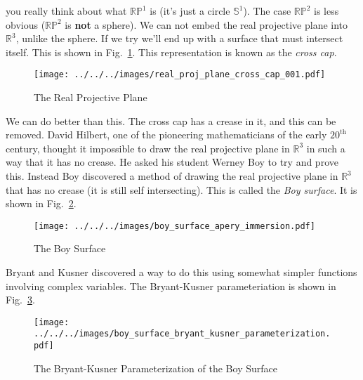 \documentclass{article}
\theoremstyle{plain}
\theoremstyle{normal}
\begin{document}
        you really think about what $\mathbb{RP}^{1}$ is
        (it's just a circle $\mathbb{S}^{1}$). The case $\mathbb{RP}^{2}$ is
        less obvious ($\mathbb{RP}^{2}$ is \textbf{not} a sphere). We can not
        embed the real projective plane into $\mathbb{R}^{3}$, unlike the
        sphere. If we try we'll end up with a surface that must intersect
        itself. This is shown in
        Fig.~\ref{fig:real_proj_plane_cross_cap_001}. This representation is
        known as the \textit{cross cap}.
        \begin{figure}
            \centering
            \texttt{[image: ../../../images/real\_proj\_plane\_cross\_cap\_001.pdf]}
            \caption{The Real Projective Plane}
            \label{fig:real_proj_plane_cross_cap_001}
        \end{figure}
        We can do better than this. The cross cap has a crease in it, and this
        can be removed. David Hilbert, one of the pioneering mathematicians of
        the early $20^{\textrm{th}}$ century, thought it impossible to draw the
        real projective plane in $\mathbb{R}^{3}$ in such a way that it has
        no crease. He asked his student Werney Boy to try and prove this.
        Instead Boy discovered a method of drawing the real projective plane
        in $\mathbb{R}^{3}$ that has no crease (it is still self intersecting).
        This is called the \textit{Boy surface}. It is shown in
        Fig.~\ref{fig:boy_surface_apery_immersion}.
        \begin{figure}
            \centering
            \texttt{[image: ../../../images/boy\_surface\_apery\_immersion.pdf]}
            \caption{The Boy Surface}
            \label{fig:boy_surface_apery_immersion}
        \end{figure}
        Bryant and Kusner discovered a way to do this using somewhat simpler
        functions involving complex variables. The Bryant-Kusner parameteriation
        is shown in Fig.~\ref{fig:boy_surface_bryant_kusner_parameterization}.
        \begin{figure}
            \centering
            \texttt{[image: ../../../images/boy\_surface\_bryant\_kusner\_parameterization.pdf]}
            \caption{The Bryant-Kusner Parameterization of the Boy Surface}
            \label{fig:boy_surface_bryant_kusner_parameterization}
        \end{figure}
\end{document}
